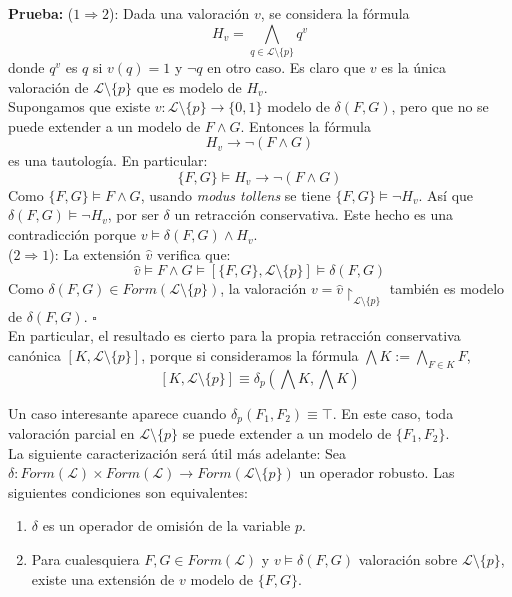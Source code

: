 \noindent \textbf{Prueba: } ($1 \Rightarrow 2$): Dada una valoración $v$, se considera la fórmula 
$$H_v = \bigwedge_{q \in \mathcal{L} \setminus \{ p \}} q^v$$
donde $q^v$ es $q$ si $v(q)=1$ y $\neg q$ en otro caso. Es claro que $v$ es la única valoración de $\mathcal{L} \setminus \{ p \}$ que es modelo de $H_v$. \\
Supongamos que existe $v  :\mathcal{L} \setminus \{p\} \rightarrow \{ 0,1 \}$ modelo de $\delta (F,G)$, pero que no se puede extender a un modelo de $F \wedge G$. Entonces la fórmula $$H_v \rightarrow \neg (F \wedge G)$$ es una tautología. En particular:
$$ \{ F,G \} \vDash H_v \rightarrow \neg (F \wedge G)$$
Como $ \{ F,G \} \vDash F \wedge G$, usando \textit{modus tollens} se tiene $\{ F,G \} \vDash \neg H_v$. Así que $\delta (F,G) \vDash \neg H_v$, por ser $\delta$ un retracción conservativa. Este hecho es una contradicción porque $v \vDash \delta (F,G) \wedge H_v$.\\
($2 \Rightarrow 1$): La extensión $\hat{v}$ verifica que:
$$\hat{v} \vDash F \wedge G \vDash [\{ F,G \} , \mathcal{L} \setminus \{ p \} ] \vDash \delta (F,G)$$
Como $\delta (F,G) \in Form(\mathcal{L} \setminus \{ p \})$, la valoración $v = \hat{v} \upharpoonright_{\mathcal{L} \setminus \{ p \}}$ también es modelo de $\delta (F,G)$. \hspace{14cm} $\square$ \\

En particular, el resultado es cierto para la propia retracción conservativa canónica $[K, \mathcal{L} \setminus \{ p \}]$, porque si consideramos la fórmula $\bigwedge K := \bigwedge_{F \in K} F$,
$$[K, \mathcal{L} \setminus \{ p \}] \equiv \delta_p (\bigwedge K , \bigwedge K)$$

Un caso interesante aparece cuando $\delta_p(F_1,F_2) \equiv \top$. En este caso, toda valoración parcial en $\mathcal{L} \setminus \{ p \}$ se puede extender a un modelo de $\{ F_1,F_2 \}$.\\

La siguiente caracterización será útil más adelante:
\cor \label{cor:robusto} Sea $\delta : Form(\mathcal{L}) \times Form(\mathcal{L}) \longrightarrow Form(\mathcal{L} \setminus \{ p \})$ un operador robusto. Las siguientes condiciones son equivalentes:
\begin{enumerate}
\item $\delta$ es un operador de omisión de la variable $p$.
\item Para cualesquiera $F,G \in Form(\mathcal{L})$ y $v \vDash \delta (F,G) $ valoración sobre $\mathcal{L} \setminus \{ p \}$, existe una extensión de $v$ modelo de $\{ F,G \}$.
\end{enumerate}

